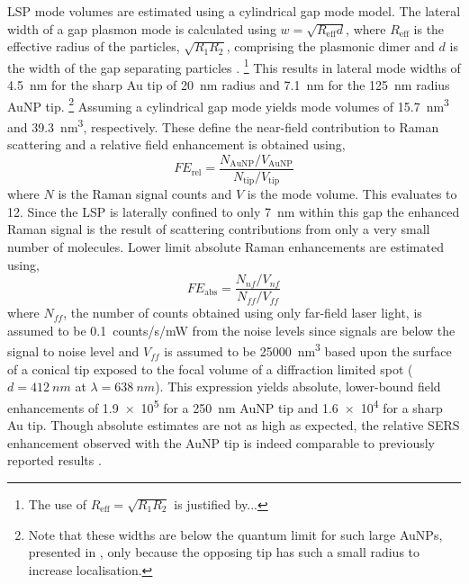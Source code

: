 \documentclass{article}
\begin{document}
LSP mode volumes are estimated using a cylindrical gap mode model. The lateral width of a gap plasmon mode is calculated using $w=\sqrt{R_{\mathrm{eff}}d}$, where $R_{\mathrm{eff}}$ is the effective radius of the particles, $\sqrt{R_1R_2}$, comprising the plasmonic dimer and $d$ is the width of the gap separating particles \cite{romero2006}.%
\footnote{\color{red}The use of $R_{\mathrm{eff}}=\sqrt{R_1 R_2}$ is justified by...}
This results in lateral mode widths of \SI{4.5}{nm} for the sharp Au tip of \SI{20}{nm} radius and \SI{7.1}{nm} for the \SI{125}{nm} radius AuNP tip.%
\footnote{Note that these widths are below the quantum limit for such large AuNPs, presented in \cite{savage2012}, only because the opposing tip has such a small radius to increase localisation.}
Assuming a cylindrical gap mode yields mode volumes of \SI{15.7}{nm\cubed} and \SI{39.3}{nm\cubed}, respectively. These define the near-field contribution to Raman scattering and a relative field enhancement is obtained using,
\begin{equation}
	\mathit{FE}_{\mathrm{rel}} = \frac{N_{\mathrm{AuNP}} / V_{\mathrm{AuNP}}}{N_{\mathrm{tip}} / V_{\mathrm{tip}}}
\end{equation}
where $N$ is the Raman signal counts and $V$ is the mode volume. This evaluates to 12.
Since the LSP is laterally confined to only \SI{7}{nm} within this gap the enhanced Raman signal is the result of scattering contributions from only a very small number of molecules. Lower limit absolute Raman enhancements are estimated using,
\begin{equation}
	\mathit{FE}_{\mathrm{abs}} = \frac{N_{nf} / V_{nf}}{N_{ff} / V_{ff}}
\end{equation}
where $N_{ff}$, the number of counts obtained using only far-field laser light, is assumed to be \SI{0.1}{counts/s/mW} from the noise levels since signals are below the signal to noise level and $V_{ff}$ is assumed to be \SI{25000}{nm\cubed} based upon the surface of a conical tip exposed to the focal volume of a diffraction limited spot ($d = \SI{412}{nm}$ at $\lambda = \SI{638}{nm}$). %
This expression yields absolute, lower-bound field enhancements of \num{1.9e5} for a \SI{250}{nm} AuNP tip and \num{1.6e4} for a sharp Au tip. Though absolute estimates are not as high as expected, the relative SERS enhancement observed with the AuNP tip is indeed comparable to previously reported results \cite{umakoshi2012}.
\end{document}
